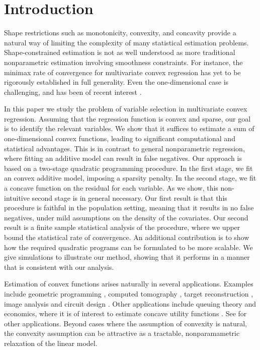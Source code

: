 
\section{Introduction}


Shape restrictions such as monotonicity, convexity, and concavity
provide a natural way of limiting the complexity of many statistical
estimation problems.  Shape-constrained estimation is not as well
understood as more traditional nonparametric estimation involving
smoothness constraints.  For instance, the minimax rate of convergence
for multivariate convex regression has yet to be rigorously
established in full generality.  Even the one-dimensional case is
challenging, and has been of recent interest \citep{guntusen:13}.

In this paper we study the problem of variable selection in
multivariate convex regression.  Assuming that the regression function
is convex and sparse, our goal is to identify the relevant variables.
We show that it suffices to estimate a sum of one-dimensional convex
functions, leading to significant computational and statistical
advantages.  This is in contrast to general nonparametric regression,
where fitting an additive model can result in false negatives.  Our
approach is based on a two-stage quadratic programming procedure.  In
the first stage, we fit an convex additive model, imposing a sparsity
penalty.  In the second stage, we fit a concave function on the
residual for each variable.  As we show, this non-intuitive second
stage is in general necessary.  Our first result is that this
procedure is faithful in the population setting, meaning that it
results in no false negatives, under mild assumptions on the density
of the covariates.  Our second result is a finite sample statistical
analysis of the procedure, where we upper bound the statistical rate
of convergence.  An additional contribution is to show how the
required quadratic programs can be formulated to be more scalable.  We
give simulations to illustrate our method, showing that it performs in
a manner that is consistent with our analysis.

Estimation of convex functions arises naturally in several
applications.  Examples include geometric programming \citep{Boyd04},
computed tomography \citep{Prince:90}, target reconstruction
\citep{Lele:92}, image analysis \citep{Golden:06} and circuit design
\citep{Hannah:12}.  Other applications include queuing theory
\citep{Chen:01} and economics, where it is of interest to estimate
concave utility functions \citep{Pratt:68}.  See \cite{Lim:12} for
other applications.  
Beyond cases where the assumption of convexity is
natural, the convexity assumption can be attractive as a
tractable, nonparamametric relaxation of the linear model.  


